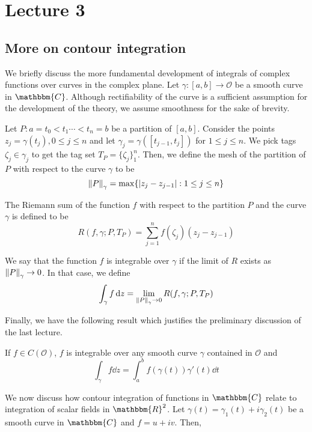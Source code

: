 \documentclass[../ComplexAnalysis_Notes.tex]{subfiles}
\begin{document}
\chapter*{Lecture 3} %
\setcounter{chapter}{3} %
\setcounter{section}{0}
\setcounter{equation}{0}
\setcounter{figure}{0}

\section{More on contour integration}

We briefly discuss the more fundamental development of integrals of complex functions over curves in the complex plane. Let \( \gamma: [a,b] \to \mathcal{O} \) be a smooth curve in \( \mathbbm{C} \). Although rectifiability of the curve is a sufficient assumption for the development of the theory, we assume smoothness for the sake of brevity.

Let \( P: a = t_0 < t_1 \cdots < t_n = b \) be a partition of \( [a,b] \). Consider the points \( z_j = \gamma(t_j), 0 \leq j \leq n \) and let \( \gamma_j = \gamma([t_{j-1}, t_j]) \) for \( 1 \leq j \leq n \). We pick tags \( \zeta_j \in \gamma_j \) to get the tag set \( T_P = \{\zeta_j\}_1^n \). Then, we define the mesh of the partition of \( P \) with respect to the curve \( \gamma \) to be 
\[ 
 \norm{P}_\gamma = \max\{\abs{z_j - z_{j-1}}: 1 \leq j \leq n\} 
 \]

The Riemann sum of the function \( f \) with respect to the partition \( P \) and the curve \( \gamma \) is defined to be
\[ 
R(f,\gamma; P, T_P) = \sum_{j=1}^{n}f(\zeta_j) (z_j - z_{j-1})
\]

We say that the function \( f \) is integrable over \( \gamma \) if the limit of \( R \) exists as \( \norm{P}_\gamma \to 0 \). In that case, we define
\[ 
  \int_\gamma f \dd{z} = \lim_{\norm{P}_\gamma \to 0} R(f,\gamma; P, T_P)
  \]

Finally, we have the following result which justifies the preliminary discussion of the last lecture.

\begin{Thm}{}{}
If \( f \in C(\mathcal{O}) \), \( f \) is integrable over any smooth curve \( \gamma \) contained in \( \mathcal{O} \) and 
\[ 
  \int_\gamma f \dd{z} = \int_a^b f(\gamma(t))\gamma'(t) \dd{t}
  \]
\end{Thm}

We now discuss how contour integration of functions in \( \mathbbm{C} \) relate to integration of scalar fields in \( \mathbbm{R}^2 \). Let \( \gamma(t) = \gamma_1(t) + i \gamma_2(t) \) be a smooth curve in \( \mathbbm{C} \) and \( f = u+iv \). Then,
\end{document}
